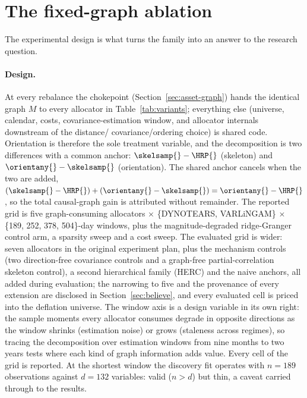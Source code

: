 \section{The fixed-graph ablation}
\label{sec:ablation-design}

The experimental design is what turns the family into an answer to the research
question.

\paragraph{Design.} At every rebalance the chokepoint
(Section~\ref{sec:asset-graph}) hands the identical graph $M$ to
every allocator in Table~\ref{tab:variants}; everything else (universe,
calendar, costs,
covariance-estimation window, and allocator internals downstream of the
distance/
covariance/ordering choice) is shared code. Orientation is therefore the
sole treatment variable, and the decomposition is two differences with a
common anchor: $\skelsamp{}-\HRP{}$ (skeleton) and
$\orientany{}-\skelsamp{}$ (orientation). The shared anchor cancels when
the two are added,
$(\skelsamp{}-\HRP{}) + (\orientany{}-\skelsamp{}) =
\orientany{}-\HRP{}$, so the total causal-graph gain is attributed
without remainder. The reported grid is five graph-consuming allocators $\times$
\{DYNOTEARS, VARLiNGAM\} $\times$ \{189, 252, 378, 504\}-day windows, plus
the magnitude-degraded ridge-Granger control arm, a sparsity sweep and a cost
sweep. The evaluated grid is wider: seven allocators in the original
experiment plan, plus the mechanism controls (two direction-free
covariance controls and a graph-free partial-correlation skeleton
control), a second hierarchical family (HERC) and the naive anchors,
all added during
evaluation; the narrowing to five and the provenance of every extension
are disclosed in Section~\ref{sec:believe}, and every evaluated cell is
priced into the deflation universe. The window axis is a
design variable in its own right: the sample moments every allocator
consumes degrade in opposite directions as the window shrinks (estimation
noise) or grows (staleness across regimes), so tracing the decomposition
over estimation windows from nine months to two years tests where each kind of
graph information adds value. Every cell of the grid is reported. At the
shortest window the discovery
fit
operates with $n=189$ observations against $d=132$ variables: valid
($n>d$) but thin, a caveat carried through to the results.

